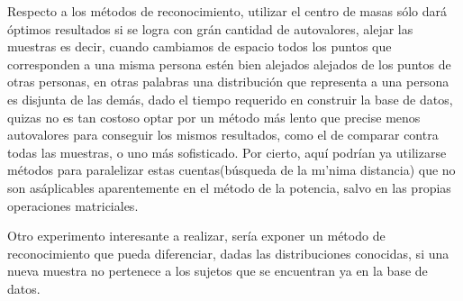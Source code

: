 Respecto a los m\'etodos de reconocimiento, utilizar el centro de masas s\'olo dar\'a \'optimos resultados si se logra con gr\'an cantidad de autovalores, alejar las muestras es decir, cuando cambiamos de espacio todos los puntos que corresponden a una misma persona est\'en bien alejados alejados de los puntos de otras personas, en otras palabras una distribuci\'on que representa a una persona es disjunta de las dem\'as, dado el tiempo requerido en construir la base de datos, quizas no es tan costoso optar por un m\'etodo m\'as lento que precise menos autovalores para conseguir los mismos resultados, como el de comparar contra todas las muestras, o uno m\'as sofisticado. Por cierto, aqu\'i podr\'ian ya utilizarse m\'etodos para paralelizar estas cuentas(b\'usqueda de la m\i'nima distancia) que no son as\' aplicables aparentemente en el m\'etodo de la potencia, salvo en las propias operaciones matriciales.

Otro experimento interesante a realizar, ser\'ia exponer un m\'etodo de reconocimiento que pueda diferenciar, dadas las distribuciones conocidas, si una nueva muestra no pertenece a los sujetos que se encuentran ya en la base de datos.

